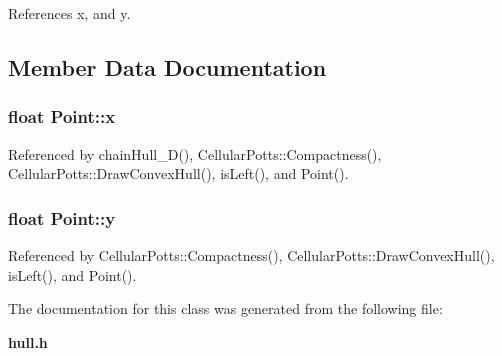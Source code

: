 References x, and y.



\subsection{Member Data Documentation}
\subsubsection[{x}]{\setlength{\rightskip}{0pt plus 5cm}float Point\-::x}\label{classPoint_a05dfe2dfbde813ad234b514f30e662f1}


Referenced by chain\-Hull\-\_\-D(), Cellular\-Potts\-::\-Compactness(), Cellular\-Potts\-::\-Draw\-Convex\-Hull(), is\-Left(), and Point().

\subsubsection[{y}]{\setlength{\rightskip}{0pt plus 5cm}float Point\-::y}\label{classPoint_a6101960c8d2d4e8ea1d32c9234bbeb8d}


Referenced by Cellular\-Potts\-::\-Compactness(), Cellular\-Potts\-::\-Draw\-Convex\-Hull(), is\-Left(), and Point().



The documentation for this class was generated from the following file\-:\begin{DoxyCompactItemize}
\item 
{\bf hull.\-h}\end{DoxyCompactItemize}
